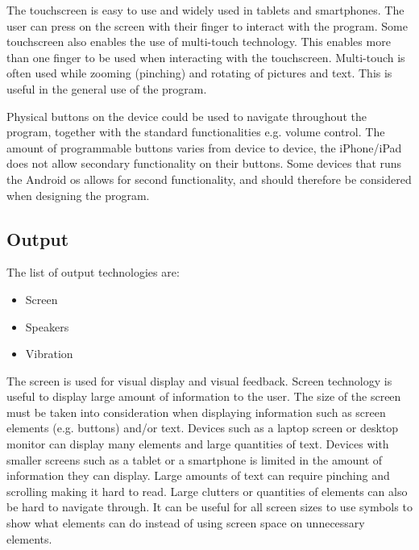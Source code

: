 The touchscreen is easy to use and widely used\cite{barcodeInc_FAQ} in tablets and smartphones. The user can press on the screen with their finger to interact with the program. Some touchscreen also enables the use of multi-touch technology. This enables more than one finger to be used when interacting with the touchscreen. Multi-touch is often used while zooming (pinching) and rotating of pictures and text. This is useful in the general use of the program.
%

Physical buttons on the device could be used to navigate throughout the program, together with the standard functionalities e.g. volume control. The amount of programmable buttons varies from device to device, the iPhone/iPad does not allow secondary functionality on their buttons. Some devices that runs the Android os allows for second functionality\cite{android_Rebind}, and should therefore be considered when designing the program.

\subsection{Output}
The list of output technologies are:

\begin{itemize}
    \item Screen
    \item Speakers
    \item Vibration
\end{itemize}

The screen is used for visual display and visual feedback. Screen technology is useful to display large amount of information to the user.
The size of the screen must be taken into consideration when displaying information such as screen elements (e.g. buttons) and/or text.
Devices such as a laptop screen or desktop monitor can display many elements and large quantities of text.
Devices with smaller screens such as a tablet or a smartphone is limited in the amount of information they can display.
Large amounts of text can require pinching and scrolling making it hard to read. Large clutters or quantities of elements can also be hard to navigate through.
It can be useful for all screen sizes to use symbols to show what elements can do instead of using screen space on unnecessary elements.

